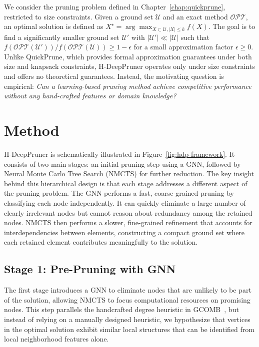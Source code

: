 We consider the pruning problem defined in Chapter~\ref{chap:quickprune}, restricted to size constraints.
Given a ground set $\mathcal{U}$ and an exact method $\mathcal{OPT}$, an optimal solution
is defined as $X^\star = \arg\max_{X \subset \mathcal{U}, |X| \leq k} f(X)$. The goal is
to find a significantly smaller ground set $\mathcal{U}'$ with
$|\mathcal{U}'| \ll |\mathcal{U}|$ such that
$f(\mathcal{OPT}(\mathcal{U}')) / f(\mathcal{OPT}(\mathcal{U})) \geq 1 - \epsilon$
for a small approximation factor $\epsilon \geq 0$. Unlike QuickPrune,
which provides formal approximation guarantees under both size and knapsack constraints,
H-DeepPruner operates only under size constraints and offers no theoretical guarantees.
Instead, the motivating question is empirical: \emph{Can a learning-based pruning method
achieve competitive performance without any hand-crafted features or domain knowledge?}

\section{Method}

H-DeepPruner is schematically illustrated in Figure~\ref{fig:hdp-framework}. It consists
of two main stages: an initial pruning step using a GNN, followed by Neural Monte Carlo
Tree Search (NMCTS) for further reduction. The key insight behind this hierarchical
design is that each stage addresses a different aspect of the pruning problem. The GNN
performs a fast, coarse-grained pruning by classifying each node independently. It
can quickly eliminate a large number of clearly irrelevant nodes but cannot reason about redundancy among
the retained nodes. NMCTS then performs a slower, fine-grained refinement that accounts
for interdependencies between elements, constructing a compact ground set where each
retained element contributes meaningfully to the solution.

\subsection{Stage 1: Pre-Pruning with GNN}

The first stage introduces a GNN to eliminate nodes that are unlikely to be part of the
solution, allowing NMCTS to focus computational resources on promising nodes. This step
parallels the handcrafted degree heuristic in GCOMB~\citep{manchanda2020gcomb}, but
instead of relying on a manually designed heuristic, we hypothesize that vertices in the
optimal solution exhibit similar local structures that can be identified from local
neighborhood features alone. 

